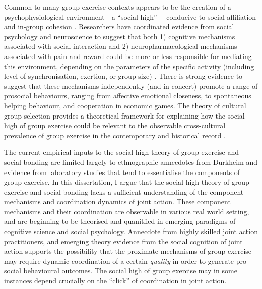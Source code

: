 Common to many group exercise contexts appears to be the creation of a psychophysiological environment---a ``social high''--- conducive to social affiliation and in-group cohesion \citep{Davis2015}. Researchers have coordinated evidence from social psychology and neuroscience to suggest that both 1) cognitive mechanisms associated with social interaction and 2) neuropharmacological mechanisms associated with pain and reward could be more or less responsible for mediating this environment, depending on the parameters of the specific activity (including level of synchronisation, exertion, or group size) \citep{Mogan2017}. There is strong evidence to suggest that these mechanisms independently (and in concert) promote a range of prosocial behaviours, ranging from affective emotional closeness, to spontaneous helping behaviour, and cooperation in economic games. The theory of cultural group selection provides a theoretical framework for explaining how the social high of group exercise could be relevant to the observable cross-cultural prevalence of group exercise in the contemporary and historical record \citep{Dunbar2010,Whitehouse2014a}.

The current empirical inputs to the social high theory of group exercise and social bonding are limited largely to ethnographic annecdotes from Durkheim and evidence from laboratory studies that tend to essentialise the components of group exercise.  In this dissertation, I argue that the social high theory of group exercise and social bonding lacks a sufficient understanding of the component mechanisms and coordination dynamics of joint action.  These component mechanisms and their coordination are observable in various real world setting, and are beginning to be theorised and quanitfied in emerging paradigms of cognitive science and social psychology.  Annecdote from highly skilled joint action practitioners, and emerging theory evidence from the social cognition of joint action supports the possibility that the proximate mechanisms of group exercise may require dynamic coordination of a certain \textit{quality} in order to generate pro-social behavioural outcomes.  The social high of group exercise may in some instances depend crucially on the ``click'' of coordination in joint action.

